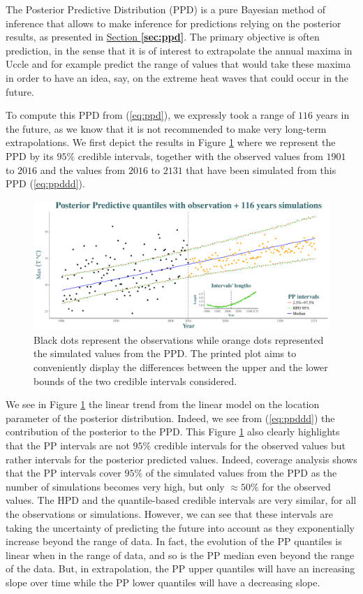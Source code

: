 The Posterior Predictive Distribution (PPD) is a pure Bayesian method of inference that allows to make inference for predictions relying on the posterior results, as presented in \hyperref[sec:ppd]{Section \textbf{\ref{sec:ppd}}}. The primary objective is often prediction, in the sense that it is of interest to extrapolate the annual maxima in Uccle and for example predict the range of values that would take these maxima in order to have an idea, say, on the extreme heat waves that could occur in the future. 


To compute this PPD from (\ref{eq:ppd}), we expressly took a range of $116$ years in the future, as we know that it is not recommended to make very long-term extrapolations. We first depict the results in Figure \ref{fig:ppd} where we represent the PPD by its $95\%$ credible intervals, together with the observed values from $1901$ to $2016$ and the values from $2016$ to $2131$ that have been simulated from this PPD (\ref{eq:ppddd}).

 \begin{figure}[!htb]
 	\centering	\includegraphics[width=0.9\linewidth]{ppd.pdf}\caption{Black dots represent the observations while orange dots represented the simulated values from the PPD. The printed plot aims to conveniently display the differences between the upper and the lower bounds of the two credible intervals considered.}\label{fig:ppd}
 \end{figure}
 
 We see in Figure \ref{fig:ppd} the linear trend from the linear model on the location parameter of the posterior distribution.  Indeed, we see from (\ref{eq:ppddd}) the contribution of the posterior to the PPD. 
 This Figure \ref{fig:ppd} also clearly highlights that the PP intervals are not $95\%$ credible intervals for the observed values but rather intervals for the posterior predicted values. Indeed, coverage analysis shows that the PP intervals cover $95\%$ of the simulated values from the PPD as the number of simulations becomes very high, but only $\approx 50\%$ for the observed values. The HPD and the quantile-based credible intervals are very similar, for all the observations or simulations. 
  However, we can see that these intervals are taking the uncertainty of predicting the future into account as they exponentially increase beyond the range of data. 
 In fact, the evolution of the PP quantiles is linear when in the range of data, and so is the PP median even beyond the range of the data. But, in extrapolation, the PP upper quantiles will have an increasing slope over time while the PP lower quantiles will have a decreasing slope.
 
